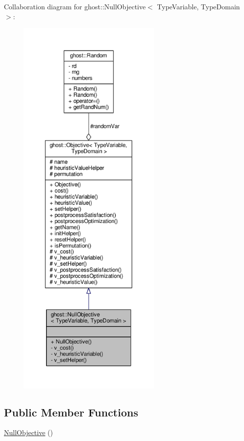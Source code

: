 Collaboration diagram for ghost\-:\-:Null\-Objective$<$ Type\-Variable, Type\-Domain $>$\-:\nopagebreak
\begin{figure}[H]
\begin{center}
\leavevmode
\includegraphics[height=550pt]{classghost_1_1NullObjective__coll__graph}
\end{center}
\end{figure}
\subsection*{Public Member Functions}
\begin{DoxyCompactItemize}
\item 
\hyperlink{classghost_1_1NullObjective_acb468a9e5fd85d31c3afc805481919ed}{Null\-Objective} ()
\end{DoxyCompactItemize}
